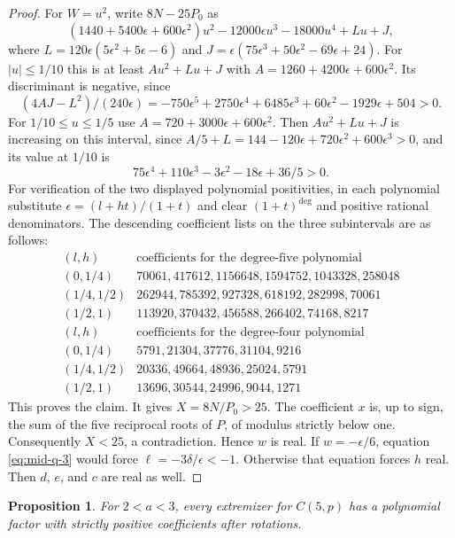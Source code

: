 \documentclass[11pt]{article}
\newtheorem{proposition}[theorem]{Proposition}
\begin{document}
\begin{proof}
For \(W=u^2\), write \(8N-25P_0\) as
\[
 (1440+5400\epsilon+600\epsilon^2)u^2
 -12000\epsilon u^3-18000u^4+L u+J,
\]
where
\(L=120\epsilon(5\epsilon^2+5\epsilon-6)\) and
\(J=\epsilon(75\epsilon^3+50\epsilon^2-69\epsilon+24)\).
For \(|u|\le1/10\) this is at least \(A u^2+L u+J\) with
\(A=1260+4200\epsilon+600\epsilon^2\). Its discriminant is
negative, since
\[
 (4AJ-L^2)/(240\epsilon)
 =-750\epsilon^5+2750\epsilon^4+6485\epsilon^3
       +60\epsilon^2-1929\epsilon+504>0.
\]
For \(1/10\le u\le1/5\) use
\(A=720+3000\epsilon+600\epsilon^2\).
Then \(A u^2+L u+J\) is increasing on this interval, since
\(A/5+L=144-120\epsilon+720\epsilon^2+600\epsilon^3>0\),
and its value at \(1/10\) is
\[
 75\epsilon^4+110\epsilon^3-3\epsilon^2-18\epsilon+36/5>0.
\]
For verification of the two displayed polynomial positivities,
in each polynomial substitute \(\epsilon=(l+h t)/(1+t)\)
and clear \((1+t)^{\deg}\) and positive rational denominators.
The descending coefficient lists on the three subintervals
are as follows:
\[
\begin{array}{c|r}
(l,h)&\text{coefficients for the degree-five polynomial}\\ \hline
(0,1/4)&70061,417612,1156648,1594752,1043328,258048\\
(1/4,1/2)&262944,785392,927328,618192,282998,70061\\
(1/2,1)&113920,370432,456588,266402,74168,8217\\[2pt]
(l,h)&\text{coefficients for the degree-four polynomial}\\ \hline
(0,1/4)&5791,21304,37776,31104,9216\\
(1/4,1/2)&20336,49664,48936,25024,5791\\
(1/2,1)&13696,30544,24996,9044,1271
\end{array}
\]
This proves the claim. It gives \(X=8N/P_0>25\).
The coefficient \(x\) is, up to sign, the sum of the
five reciprocal roots of \(P\), of modulus strictly below one.
Consequently \(X<25\), a contradiction. Hence \(w\) is real.
If \(w=-\epsilon/6\), equation \eqref{eq:mid-q-3} would force
\(\ell=-3\delta/\epsilon<-1\). Otherwise that equation forces
\(h\) real. Then \(d\), \(e\), and \(c\) are real as well.
\end{proof}
\begin{proposition}\label{prop:middle-positive-phase}
For \(2<a<3\), every extremizer for \(C(5,p)\) has a polynomial
factor with strictly positive coefficients after rotations.
\end{proposition}
\end{document}
